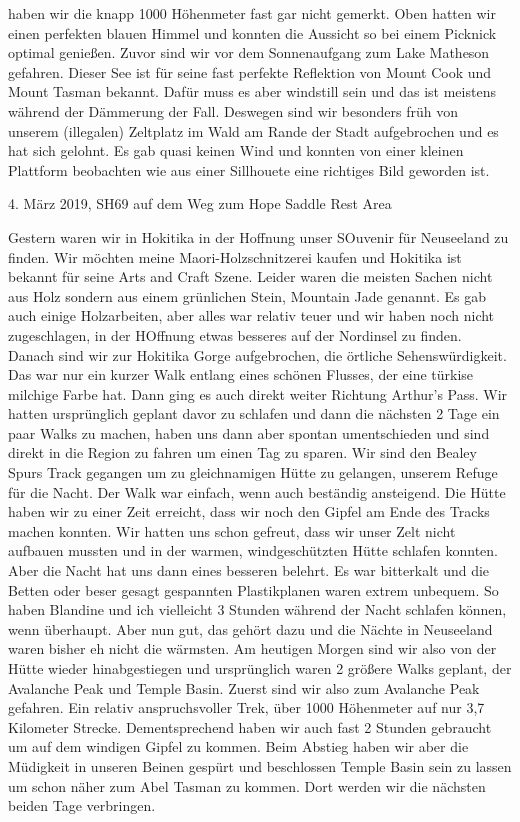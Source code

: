 \documentclass[11pt]{book}
\begin{document}
haben wir die knapp 1000 Höhenmeter fast gar nicht gemerkt. Oben hatten wir einen perfekten blauen Himmel und konnten die 
Aussicht so bei einem Picknick optimal genießen. Zuvor sind wir vor dem Sonnenaufgang zum Lake Matheson gefahren. Dieser See 
ist für seine fast perfekte Reflektion von Mount Cook und Mount Tasman bekannt. Dafür muss es aber windstill sein und das ist meistens 
während der Dämmerung der Fall. Deswegen sind wir besonders früh von unserem (illegalen) Zeltplatz im Wald am Rande der Stadt aufgebrochen 
und es hat sich gelohnt. Es gab quasi keinen Wind und konnten von einer kleinen Plattform beobachten wie aus einer Sillhouete eine 
richtiges Bild geworden ist.

4. März 2019, SH69 auf dem Weg zum Hope Saddle Rest Area

Gestern waren wir in Hokitika in der Hoffnung unser SOuvenir für Neuseeland zu finden. Wir möchten meine Maori-Holzschnitzerei 
kaufen und Hokitika ist bekannt für seine Arts and Craft Szene. Leider waren die meisten Sachen nicht aus Holz sondern aus einem 
grünlichen Stein, Mountain Jade genannt. Es gab auch einige Holzarbeiten, aber alles war relativ teuer und wir haben noch nicht 
zugeschlagen, in der HOffnung etwas besseres auf der Nordinsel zu finden. Danach sind wir zur Hokitika Gorge aufgebrochen, die 
örtliche Sehenswürdigkeit. Das war nur ein kurzer Walk entlang eines schönen Flusses, der eine türkise milchige Farbe hat. Dann ging
es auch direkt weiter Richtung Arthur's Pass. Wir hatten ursprünglich geplant davor zu schlafen und dann die nächsten 2 Tage ein paar 
Walks zu machen, haben uns dann aber spontan umentschieden und sind direkt in die Region zu fahren um einen Tag zu sparen. Wir 
sind den Bealey Spurs Track gegangen um zu gleichnamigen Hütte zu gelangen, unserem Refuge für die Nacht. Der Walk war einfach, 
wenn auch beständig ansteigend. Die Hütte haben wir zu einer Zeit erreicht, dass wir noch den Gipfel am Ende des Tracks machen konnten. 
Wir hatten uns schon gefreut, dass wir unser Zelt nicht aufbauen mussten und in der warmen, windgeschützten Hütte schlafen konnten. Aber 
die Nacht hat uns dann eines besseren belehrt. Es war bitterkalt und die Betten oder beser gesagt gespannten Plastikplanen waren 
extrem unbequem. So haben Blandine und ich vielleicht 3 Stunden während der Nacht schlafen können, wenn überhaupt. Aber nun gut, 
das gehört dazu und die Nächte in Neuseeland waren bisher eh nicht die wärmsten. Am heutigen Morgen sind wir also von der Hütte 
wieder hinabgestiegen und ursprünglich waren 2 größere Walks geplant, der Avalanche Peak und Temple Basin. Zuerst sind wir also 
zum Avalanche Peak gefahren. Ein relativ anspruchsvoller Trek, über 1000 Höhenmeter auf nur 3,7 Kilometer Strecke. Dementsprechend 
haben wir auch fast 2 Stunden gebraucht um auf dem windigen Gipfel zu kommen. Beim Abstieg haben wir aber die Müdigkeit in unseren 
Beinen gespürt und beschlossen Temple Basin sein zu lassen um schon näher zum Abel Tasman zu kommen. Dort werden wir die nächsten beiden 
Tage verbringen. 
\end{document}
